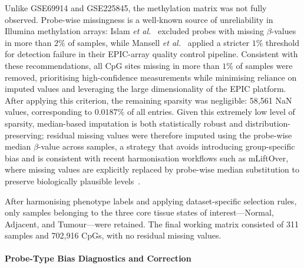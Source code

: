 Unlike GSE69914 and GSE225845, the methylation matrix was not fully observed.
Probe-wise missingness is a well-known source of unreliability in Illumina
methylation arrays: Islam \textit{et al.}~\cite{islam2019_pediatric_dnamm}
excluded probes with missing $\beta$-values in more than $2\%$ of samples,
while Mansell \textit{et al.}~\cite{mansell2019guidance} applied a stricter
$1\%$ threshold for detection failure in their EPIC-array quality control
pipeline. Consistent with these recommendations, all CpG sites missing in more
than $1\%$ of samples were removed, prioritising high-confidence measurements
while minimising reliance on imputed values and leveraging the large
dimensionality of the EPIC platform. After applying this criterion, the
remaining sparsity was negligible: 58{,}561 NaN values, corresponding to
$0.0187\%$ of all entries. Given this extremely low level of sparsity,
median-based imputation is both statistically robust and
distribution-preserving; residual missing values were therefore imputed using
the probe-wise median $\beta$-value across samples, a strategy that avoids
introducing group-specific bias and is consistent with recent harmonisation
workflows such as mLiftOver, where missing values are explicitly replaced by
probe-wise median substitution to preserve biologically plausible
levels~\cite{chen2024_mliftover}.

After harmonising phenotype labels and applying dataset-specific selection
rules, only samples belonging to the three core tissue states of
interest---Normal, Adjacent, and Tumour---were retained. The final working
matrix consisted of 311 samples and 702{,}916 CpGs, with no residual missing
values.

\paragraph{Probe-Type Bias Diagnostics and Correction}
\label{subpar:gse287331_typebias}

